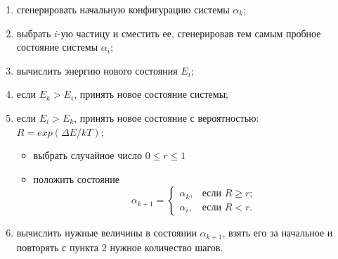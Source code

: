 \documentclass[14pt,a4paper,report]{ncc}
\begin{document}
\vspace{8mm}
\begin{enumerate}
\item сгенерировать начальную конфигурацию системы $\alpha_k$;
\item выбрать $i$-ую частицу и сместить ее, сгенерировав тем самым пробное состояние системы  $\alpha_i$;
\item вычислить энергию нового состояния $E_i$;
\item если $E_k>E_i$, принять новое состояние системы;
\item если $E_i>E_k$, принять новое состояние с вероятностью:\\
$R=exp(\Delta E/kT)$;
\begin{itemize}
\item выбрать случайное число $0\le r\le 1$
\item положить состояние 
\[
\alpha_{k+1}=
\begin{cases}
\alpha_k, & \text{если $R\ge r$;} \\
\alpha_i, & \text{если $R<r$.}
\end{cases}
\]
\end{itemize}
\item вычислить нужные величины в состоянии $\alpha_{k+1}$, взять его за начальное и повторять с пункта 2 нужное количество шагов.
\end{enumerate}

\newpage
\end{document}
